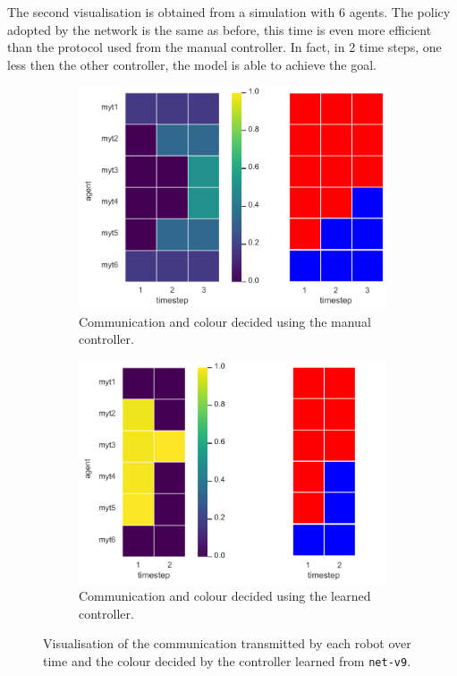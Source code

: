 \bigskip
The second visualisation is obtained from a simulation with 6 agents. 
The policy adopted by the network is the same as before, this time is even more 
efficient than the protocol used from the manual controller. In fact, in 2 time 
steps, one less then the other controller, the model is able to achieve the goal.
\begin{figure}[!htb]
	\begin{subfigure}[h]{\textwidth}
		\centering
		\includegraphics[width=.45\textwidth]{contents/images/net-v9/manual-1}
		\caption{Communication and colour decided using the manual controller.}
	\end{subfigure}
	\hspace*{\fill}%
	\vspace*{8pt}%
	\hspace*{\fill}%
	\begin{subfigure}[h]{\textwidth}
		\centering			
		\includegraphics[width=.45\textwidth]{contents/images/net-v9/learned-1}
		\caption{Communication and colour decided using the learned controller.}
	\end{subfigure}
	\caption[Evaluation of the communication learned by 
	\texttt{net-v9}.]{Visualisation of the communication transmitted by each 
		robot over time and the colour decided by the controller learned from 
		\texttt{net-v9}.}	
	\label{fig:net-v9commcolour2}
\end{figure}


